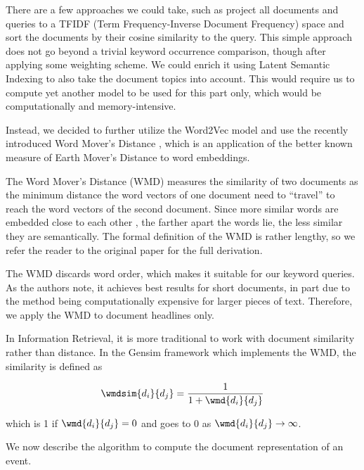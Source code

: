There are a few approaches we could take, such as project all documents and queries to a TFIDF (Term Frequency-Inverse Document Frequency) space \citep{information-retrieval} and sort the documents by their cosine similarity to the query. This simple approach does not go beyond a trivial keyword occurrence comparison, though after applying some weighting scheme. We could enrich it using Latent Semantic Indexing \citep{lsi} to also take the document topics into account. This would require us to compute yet another model to be used for this part only, which would be computationally and memory-intensive.

Instead, we decided to further utilize the Word2Vec model and use the recently introduced Word Mover's Distance \citep{wmd}, which is an application of the better known measure of Earth Mover's Distance \citep{emd} to word embeddings.

The Word Mover's Distance (WMD) measures the similarity of two documents as the minimum distance the word vectors of one document need to ``travel'' to reach the word vectors of the second document. Since more similar words are embedded close to each other \citep{linguistic-regularities}, the farther apart the words lie, the less similar they are semantically. The formal definition of the WMD is rather lengthy, so we refer the reader to the original paper \citep{wmd} for the full derivation.

The WMD discards word order, which makes it suitable for our keyword queries. As the authors note, it achieves best results for short documents, in part due to the method being computationally expensive for larger pieces of text. Therefore, we apply the WMD to document headlines only.

In Information Retrieval, it is more traditional to work with document similarity rather than distance. In the Gensim framework \citep{gensim} which implements the WMD, the similarity is defined as

\begin{equation}
	\wmdsim{d_{i}}{d_{j}} = \frac{1}{1 + \wmd{d_{i}}{d_{j}}}
\end{equation}

which is 1 if $\wmd{d_{i}}{d_{j}} = 0$ and goes to 0 as $\wmd{d_{i}}{d_{j}} \to \infty$.

We now describe the algorithm to compute the document representation of an event.

